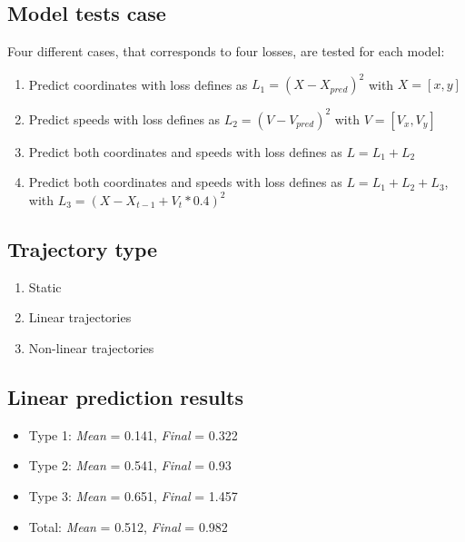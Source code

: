 \documentclass[a0,portrait]{a0poster}
\begin{document}
\begin{multicols}{2}
\subsection*{Model tests case}
Four different cases, that corresponds to four losses, are tested for each model:
\begin{enumerate}
\justifying
\item Predict coordinates with loss defines as $L_1 = (X-X_{pred})^2$ with $X = [x,y]$
\item Predict speeds with loss defines as $L_2 = (V-V_{pred})^2$ with $V = [V_x,V_y]$ 
\item Predict both coordinates and speeds with loss defines as $L = L_1 + L_2$
\item Predict both coordinates and speeds with loss defines as $L = L_1 + L_2 + L_3 $, with $L_3 = (X- X_{t-1} + V_t*0.4)^2$
\end{enumerate}
\vspace{0.5cm}
\begin{minipage}[]{0.5\linewidth}
\subsection*{Trajectory type}
\begin{enumerate}
\justifying
\item Static
\item Linear trajectories
\item Non-linear trajectories
\end{enumerate}
\end{minipage}
\hfill
\begin{minipage}[]{0.5\linewidth}
\subsection*{Linear prediction results}
\begin{itemize}
\item Type 1: \emph{Mean} = 0.141, \emph{Final} = 0.322
\item Type 2: \emph{Mean} = 0.541, \emph{Final} = 0.93
\item Type 3: \emph{Mean} = 0.651, \emph{Final} = 1.457
\item Total: \emph{Mean} = 0.512, \emph{Final} = 0.982 
\end{itemize}
\end{minipage}

\vspace{0.5cm}


\end{multicols}
\end{document}
